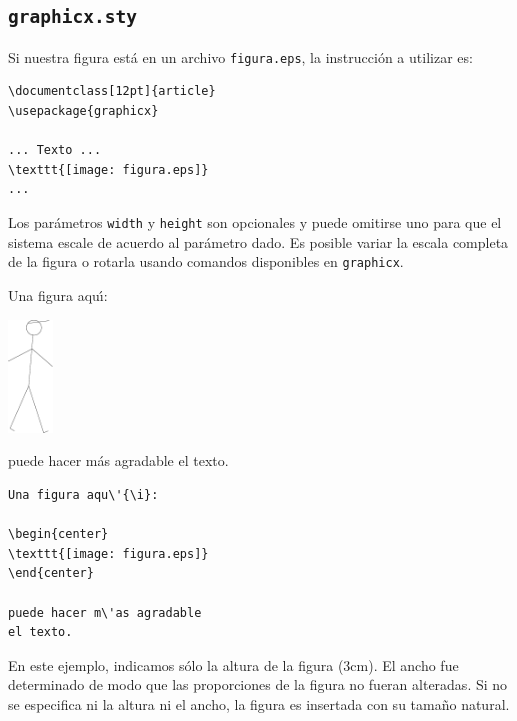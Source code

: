{\subsection{{\tt graphicx.sty}}

Si nuestra figura est{\'a} en un archivo 
\verb+figura.eps+, la instrucci{\'o}n a utilizar es:

\begin{verbatim}
\documentclass[12pt]{article}
\usepackage{graphicx}

... Texto ...
\texttt{[image: figura.eps]} 
...

\end{verbatim} 

Los par{\'a}metros \verb|width| y \verb|height| son opcionales y puede
omitirse uno para que el sistema escale de acuerdo al par{\'a}metro dado.
Es posible variar la escala completa de la figura o rotarla usando
comandos disponibles en \verb+graphicx+.

\vspace{.3cm}
{\small
\begin{minipage}[t]{5cm}
Una figura aqu\'{\i}:

\begin{center}
\includegraphics[height=3cm]{figura} %
\end{center}

puede hacer m\'as agradable el texto.
\end{minipage}
\hspace{1.5cm}
\begin{minipage}[t]{5cm}
\begin{verbatim}
Una figura aqu\'{\i}:

\begin{center}
\texttt{[image: figura.eps]} 
\end{center}

puede hacer m\'as agradable 
el texto.
\end{verbatim}
\end{minipage}
}
\vspace{.3cm}


En este ejemplo, indicamos s\'olo la altura de la figura
(3cm). El ancho fue determinado de modo que las proporciones de la
figura no fueran alteradas. Si no se especifica ni la altura ni el
ancho, la figura es insertada con su tama\~no natural. 

}
